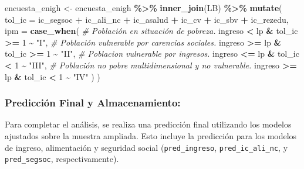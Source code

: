 \documentclass[
  12pt,
]{book}
\newenvironment{Shaded}{\begin{snugshade}}{\end{snugshade}}
\newcommand{\AttributeTok}[1]{\textcolor[rgb]{0.13,0.29,0.53}{#1}}
\newcommand{\CommentTok}[1]{\textcolor[rgb]{0.56,0.35,0.01}{\textit{#1}}}
\newcommand{\DecValTok}[1]{\textcolor[rgb]{0.00,0.00,0.81}{#1}}
\newcommand{\FunctionTok}[1]{\textcolor[rgb]{0.13,0.29,0.53}{\textbf{#1}}}
\newcommand{\NormalTok}[1]{#1}
\newcommand{\OtherTok}[1]{\textcolor[rgb]{0.56,0.35,0.01}{#1}}
\newcommand{\SpecialCharTok}[1]{\textcolor[rgb]{0.81,0.36,0.00}{\textbf{#1}}}
\newcommand{\StringTok}[1]{\textcolor[rgb]{0.31,0.60,0.02}{#1}}
\begin{document}
\begin{Shaded}
\begin{Highlighting}[]
\NormalTok{encuesta\_enigh }\OtherTok{\textless{}{-}}\NormalTok{ encuesta\_enigh }\SpecialCharTok{\%\textgreater{}\%} \FunctionTok{inner\_join}\NormalTok{(LB) }\SpecialCharTok{\%\textgreater{}\%} 
   \FunctionTok{mutate}\NormalTok{(}
   \AttributeTok{tol\_ic =}\NormalTok{ ic\_segsoc }\SpecialCharTok{+}\NormalTok{ ic\_ali\_nc }\SpecialCharTok{+}\NormalTok{ ic\_asalud }\SpecialCharTok{+}\NormalTok{ ic\_cv }\SpecialCharTok{+}\NormalTok{  ic\_sbv }\SpecialCharTok{+}\NormalTok{ ic\_rezedu,}
   \AttributeTok{ipm   =} \FunctionTok{case\_when}\NormalTok{(}
     \CommentTok{\# Población en situación de pobreza.}
\NormalTok{     ingreso }\SpecialCharTok{\textless{}}\NormalTok{ lp }\SpecialCharTok{\&}\NormalTok{ tol\_ic }\SpecialCharTok{\textgreater{}=} \DecValTok{1} \SpecialCharTok{\textasciitilde{}} \StringTok{"I"}\NormalTok{,}
     \CommentTok{\# Población vulnerable por carencias sociales.}
\NormalTok{     ingreso }\SpecialCharTok{\textgreater{}=}\NormalTok{ lp }\SpecialCharTok{\&}\NormalTok{ tol\_ic }\SpecialCharTok{\textgreater{}=} \DecValTok{1} \SpecialCharTok{\textasciitilde{}} \StringTok{"II"}\NormalTok{,}
     \CommentTok{\# Poblacion vulnerable por ingresos.}
\NormalTok{     ingreso }\SpecialCharTok{\textless{}=}\NormalTok{ lp }\SpecialCharTok{\&}\NormalTok{ tol\_ic }\SpecialCharTok{\textless{}} \DecValTok{1} \SpecialCharTok{\textasciitilde{}} \StringTok{"III"}\NormalTok{,}
     \CommentTok{\# Población no pobre multidimensional y no vulnerable.}
\NormalTok{     ingreso }\SpecialCharTok{\textgreater{}=}\NormalTok{ lp }\SpecialCharTok{\&}\NormalTok{ tol\_ic }\SpecialCharTok{\textless{}} \DecValTok{1} \SpecialCharTok{\textasciitilde{}} \StringTok{"IV"}
\NormalTok{     )}
\NormalTok{   )}
\end{Highlighting}
\end{Shaded}

\hypertarget{predicciuxf3n-final-y-almacenamiento}{%
\subsubsection*{Predicción Final y Almacenamiento:}\label{predicciuxf3n-final-y-almacenamiento}}

Para completar el análisis, se realiza una predicción final utilizando los modelos ajustados sobre la muestra ampliada. Esto incluye la predicción para los modelos de ingreso, alimentación y seguridad social (\texttt{pred\_ingreso}, \texttt{pred\_ic\_ali\_nc}, y \texttt{pred\_segsoc}, respectivamente).
\end{document}
